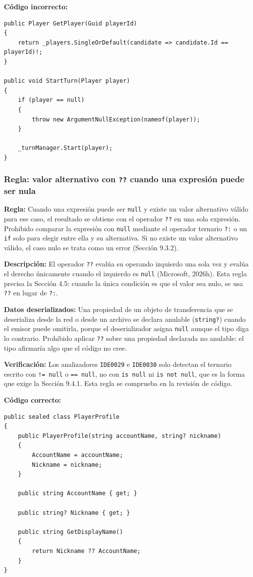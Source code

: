 \textbf{Código incorrecto:}
\begin{lstlisting}[style=csharpstyle]
public Player GetPlayer(Guid playerId)
{
    return _players.SingleOrDefault(candidate => candidate.Id == playerId)!;
}

public void StartTurn(Player player)
{
    if (player == null)
    {
        throw new ArgumentNullException(nameof(player));
    }

    _turnManager.Start(player);
}
\end{lstlisting}

\subsubsection{Regla: valor alternativo con \texttt{??} cuando una expresión puede ser nula}

\textbf{Regla:} Cuando una expresión puede ser \texttt{null} y existe un valor alternativo válido para ese caso, el resultado se obtiene con el operador \texttt{??} en una sola expresión. Prohibido comparar la expresión con \texttt{null} mediante el operador ternario \texttt{?:} o un \texttt{if} solo para elegir entre ella y su alternativa. Si no existe un valor alternativo válido, el caso nulo se trata como un error (Sección 9.3.2).

\textbf{Descripción:} El operador \texttt{??} evalúa su operando izquierdo una sola vez y evalúa el derecho únicamente cuando el izquierdo es \texttt{null} (Microsoft, 2026h). Esta regla precisa la Sección 4.5: cuando la única condición es que el valor sea nulo, se usa \texttt{??} en lugar de \texttt{?:}.

\textbf{Datos deserializados:} Una propiedad de un objeto de transferencia que se deserializa desde la red o desde un archivo se declara anulable (\texttt{string?}) cuando el emisor puede omitirla, porque el deserializador asigna \texttt{null} aunque el tipo diga lo contrario. Prohibido aplicar \texttt{??} sobre una propiedad declarada no anulable: el tipo afirmaría algo que el código no cree.

\textbf{Verificación:} Los analizadores \texttt{IDE0029} e \texttt{IDE0030} solo detectan el ternario escrito con \texttt{!= null} o \texttt{== null}, no con \texttt{is null} ni \texttt{is not null}, que es la forma que exige la Sección 9.4.1. Esta regla se comprueba en la revisión de código.

\textbf{Código correcto:}
\begin{lstlisting}[style=csharpstyle]
public sealed class PlayerProfile
{
    public PlayerProfile(string accountName, string? nickname)
    {
        AccountName = accountName;
        Nickname = nickname;
    }

    public string AccountName { get; }

    public string? Nickname { get; }

    public string GetDisplayName()
    {
        return Nickname ?? AccountName;
    }
}
\end{lstlisting}

